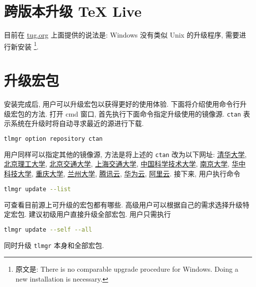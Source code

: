 \section{跨版本升级 \TeX{} Live}

目前在 \href{https://www.tug.org/texlive/upgrade.html}{tug.org}
上面提供的说法是:
Windows 没有类似 Unix 的升级程序,
需要进行新安装%
\footnote{原文是: There is no comparable upgrade procedure for Windows.
Doing a new installation is necessary.}.

\section{升级宏包}\label{sec:windows:update}

安装完成后, 用户可以升级宏包以获得更好的使用体验. 
下面将介绍使用命令行升级宏包的方法. 
打开 \textsf{cmd} 窗口, 首先执行下面命令指定升级使用的镜像源. 
\texttt{ctan} 表示系统在升级时将自动寻求最近的源进行下载. 
\begin{lstlisting}[language=bash]
  tlmgr option repository ctan
\end{lstlisting}
用户同样可以指定其他的镜像源,
方法是将上述的 \texttt{ctan} 改为以下网址:
\href{https://mirrors.tuna.tsinghua.edu.cn/CTAN/systems/texlive/tlnet}{清华大学},
\href{https://mirrors.bit.edu.cn/CTAN/systems/texlive/tlnet}{北京理工大学},
\href{https://mirror.bjtu.edu.cn/ctan/systems/texlive/tlnet}{北京交通大学},
\href{https://mirrors.sjtug.sjtu.edu.cn/ctan/systems/texlive/tlnet}{上海交通大学},
\href{https://mirrors.ustc.edu.cn/CTAN/systems/texlive/tlnet}{中国科学技术大学},
\href{https://mirrors.nju.edu.cn/CTAN/systems/texlive/tlnet}{南京大学},
\href{http://mirrors.hust.edu.cn/CTAN/systems/texlive/tlnet}{华中科技大学},
\href{https://mirrors.cqu.edu.cn/CTAN/systems/texlive/tlnet}{重庆大学},
\href{https://mirror.lzu.edu.cn/CTAN/systems/texlive/tlnet}{兰州大学},
\href{https://mirrors.cloud.tencent.com/CTAN/systems/texlive/tlnet}{腾讯云},
\href{https://mirrors.huaweicloud.com/CTAN/systems/texlive/tlnet}{华为云},
\href{https://mirrors.aliyun.com/CTAN/systems/texlive/tlnet}{阿里云}.
接下来, 用户执行命令
\begin{lstlisting}[language=bash]
  tlmgr update --list
\end{lstlisting}
可查看目前源上可升级的宏包都有哪些. 
高级用户可以根据自己的需求选择升级特定宏包.
建议初级用户直接升级全部宏包. 
用户只需执行
\begin{lstlisting}[language=bash]
  tlmgr update --self --all
\end{lstlisting}
同时升级 \texttt{tlmgr} 本身和全部宏包. 

